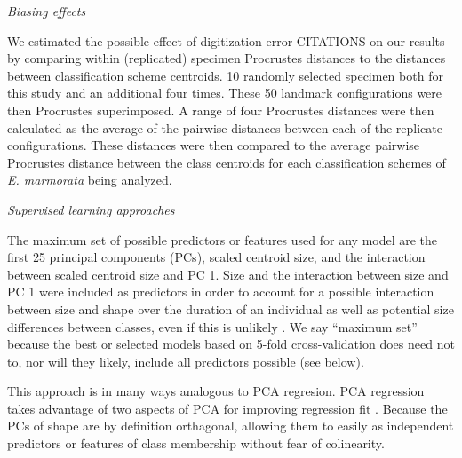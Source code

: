 \documentclass[12pt,letterpaper]{article}
\renewcommand{\subsection}[1]{%
\bigskip
\begin{center}
\begin{large}
\normalfont\itshape #1
\end{large}
\end{center}}
\begin{document}
\subsection{Biasing effects}
We estimated the possible effect of digitization error CITATIONS on our results by comparing within (replicated) specimen Procrustes distances to the distances between classification scheme centroids. 10 randomly selected specimen both for this study and an additional four times. These 50 landmark configurations were then Procrustes superimposed. A range of four Procrustes distances were then calculated as the average of the pairwise distances between each of the replicate configurations. These distances were then compared to the average pairwise Procrustes distance between the class centroids for each classification schemes of \textit{E. marmorata} being analyzed.



\subsection{Supervised learning approaches}
The maximum set of possible predictors or features used for any model are the first 25 principal components (PCs), scaled centroid size, and the interaction between scaled centroid size and PC 1. Size and the interaction between size and PC 1 were included as predictors in order to account for a possible interaction between size and shape over the duration of an individual as well as potential size differences between classes, even if this is unlikely \citep{Seeliger1945,Holland1992}. We say ``maximum set'' because the best or selected models based on 5-fold cross-validation does need not to, nor will they likely, include all predictors possible (see below).

This approach is in many ways analogous to PCA regresion. PCA regression takes advantage of two aspects of PCA for improving regression fit \citep{Hastie2009}. Because the PCs of shape are by definition orthagonal, allowing them to easily as independent predictors or features of class membership without fear of colinearity.
\end{document}
